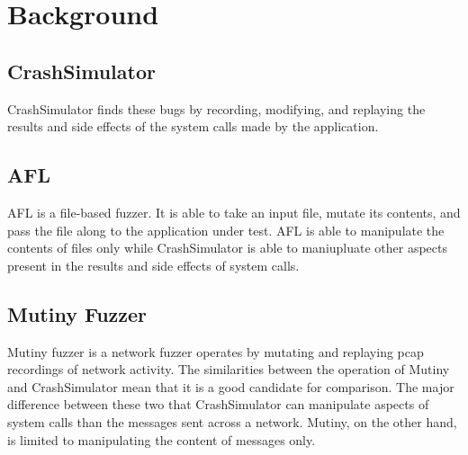 \section{Background}
\label{SEC:background}

\subsection{CrashSimulator}

CrashSimulator finds these bugs by recording, modifying, and replaying
the results and side effects of the system calls made by the application.

\subsection{AFL}

AFL is a file-based fuzzer.  It is able to take an input file, mutate its
contents, and pass the file along to the application under test.  AFL is
able to manipulate the contents of files only while CrashSimulator is able
to maniupluate other aspects present in the results and side effects of
system calls.

\subsection{Mutiny Fuzzer}

Mutiny fuzzer is a network fuzzer operates by mutating and replaying pcap
recordings of network activity.  The similarities between the operation of
Mutiny and CrashSimulator mean that it is a good candidate for comparison.
The major difference between these two that CrashSimulator can manipulate
aspects of system calls than the messages sent across a network.  Mutiny,
on the other hand, is limited to manipulating the content of messages only.
